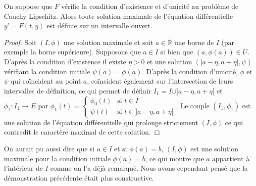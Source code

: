 \begin{thm} 
On suppose que $F$ vérifie la condition d'existence et
d'unicité au problème de Cauchy Lipschitz. Alors toute solution maximale
de l'équation différentielle $y' = F(t,y)$ est définie sur un intervalle
ouvert.
\end{thm}

\begin{proof}
Soit $(I,\phi)$ une solution maximale et soit $a \in \overline{\mathbb{R}}$ une borne de $I$ (par exemple la borne
supérieure). Supposons que $a \in I$ si bien que $(a,\phi(a)) \in U$. D'après la
condition d'existence il existe $\eta > 0$ et une solution $(]a - \eta,a + \eta[,\psi)$ vérifiant la condition initiale $\psi(a) = \phi(a)$. D'après la
condition d'unicité, $\phi$ et $\psi$ qui coïncident au point $a$, coïncident
également sur l'intersection de leurs intervalles de définition, ce qui
permet de définir $I_1 = I \cup ]a - \eta,a + \eta[$ et $\phi_1 :
I_1 \rightarrow E$ par $\phi_1(t) = \begin{cases}
\phi_0(t) & \text{si } t \in I \\
\psi(t) & \text{si } t \in ]a - \eta,a + \eta[
\end{cases}$. Le couple $(I_1,\phi_1)$ est une
solution de l'équation différentielle qui prolonge strictement $(I,\phi)$ ce
qui contredit le caractère maximal de cette solution.
\end{proof}

\begin{rem}
On aurait pu aussi dire que si $a \in I$ et si $\phi(a) = b$,
$(I,\phi)$ est une solution maximale pour la condition initiale $\phi(a) = b$, ce
qui montre que $a$ appartient à l'intérieur de $I$ comme on l'a déjà
remarqué. Nous avons cependant pensé que la démonstration précédente
était plus constructive.
\end{rem}